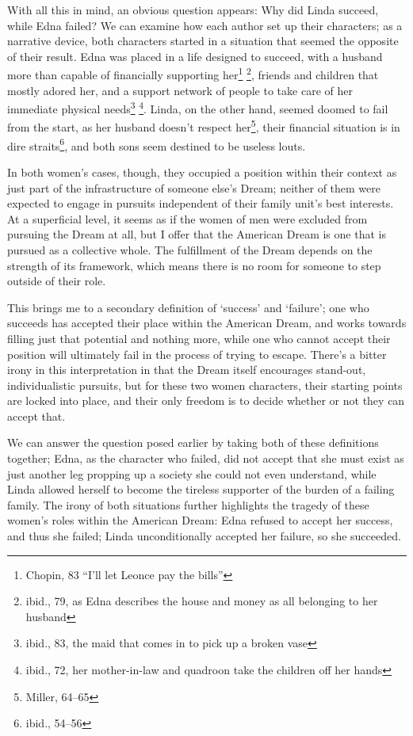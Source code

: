 With all this in mind, an obvious question appears: Why did Linda succeed, while
Edna failed? We can examine how each author set up their characters; as a
narrative device, both characters started in a situation that seemed the
opposite of their result.  Edna was placed in a life designed to succeed, with a
husband more than capable of financially supporting her\footnote{Chopin, 83
``I'll let Leonce pay the bills''} \footnote{ibid., 79, as Edna describes the
house and money as all belonging to her husband}, friends and children that
mostly adored her, and a support network of people to take care of her immediate
physical needs\footnote{ibid., 83, the maid that comes in to pick up a broken
vase} \footnote{ibid., 72, her mother-in-law and quadroon take the children off
her hands}. Linda, on the other hand, seemed doomed to fail from the start, as
her husband doesn't respect her\footnote{Miller, 64--65}, their financial
situation is in dire straits\footnote{ibid., 54--56}, and both sons seem
destined to be useless louts.

In both women's cases, though, they occupied a position within their context as
just part of the infrastructure of someone else's Dream; neither of them were
expected to engage in pursuits independent of their family unit's best
interests. At a superficial level, it seems as if the women of men were excluded
from pursuing the Dream at all, but I offer that the American Dream is one that
is pursued as a collective whole. The fulfillment of the Dream depends on the
strength of its framework, which means there is no room for someone to step
outside of their role.

This brings me to a secondary definition of `success' and `failure'; one who
succeeds has accepted their place within the American Dream, and works towards
filling just that potential and nothing more, while one who cannot accept their
position will ultimately fail in the process of trying to escape.  There's a
bitter irony in this interpretation in that the Dream itself encourages
stand-out, individualistic pursuits, but for these two women characters, their
starting points are locked into place, and their only freedom is to decide
whether or not they can accept that.

We can answer the question posed earlier by taking both of these definitions
together; Edna, as the character who failed, did not accept that she must exist
as just another leg propping up a society she could not even understand, while
Linda allowed herself to become the tireless supporter of the burden of a
failing family. The irony of both situations further highlights the tragedy of
these women's roles within the American Dream: Edna refused to accept her
success, and thus she failed; Linda unconditionally accepted her failure, so she
succeeded.

